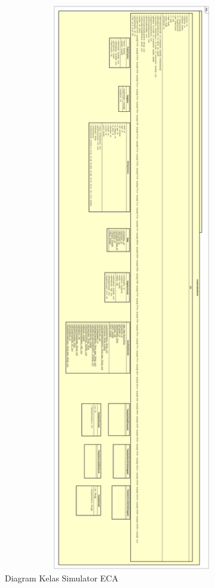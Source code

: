 \begin{figure} [H]
	\centering  
	\includegraphics[width=16cm, height=25cm]{diagramKelas1}
	\caption[Diagram Kelas Simulator ECA]{Diagram Kelas Simulator ECA} 
	\label{fig:classdiagram2} 
\end{figure}

